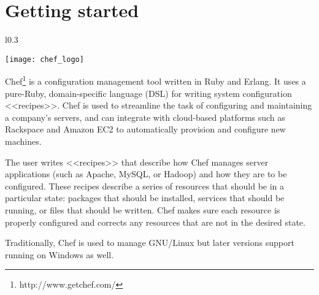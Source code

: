 \chapter{Getting started}

\begin{wrapfigure}{l}{0.3\textwidth}
  \vspace{-20pt}
  \begin{center}
    \texttt{[image: chef\_logo]}
  \end{center}
  \vspace{-20pt}
\end{wrapfigure}

Chef\footnote{http://www.getchef.com/} is a configuration management tool written in Ruby and Erlang. It uses a pure-Ruby, domain-specific language (DSL) for writing system configuration <<recipes>>. Chef is used to streamline the task of configuring and maintaining a company's servers, and can integrate with cloud-based platforms such as Rackspace and Amazon EC2 to automatically provision and configure new machines.

The user writes <<recipes>> that describe how Chef manages server applications (such as Apache, MySQL, or Hadoop) and how they are to be configured. These recipes describe a series of resources that should be in a particular state: packages that should be installed, services that should be running, or files that should be written. Chef makes sure each resource is properly configured and corrects any resources that are not in the desired state.

Traditionally, Chef is used to manage GNU/Linux but later versions support running on Windows as well.



